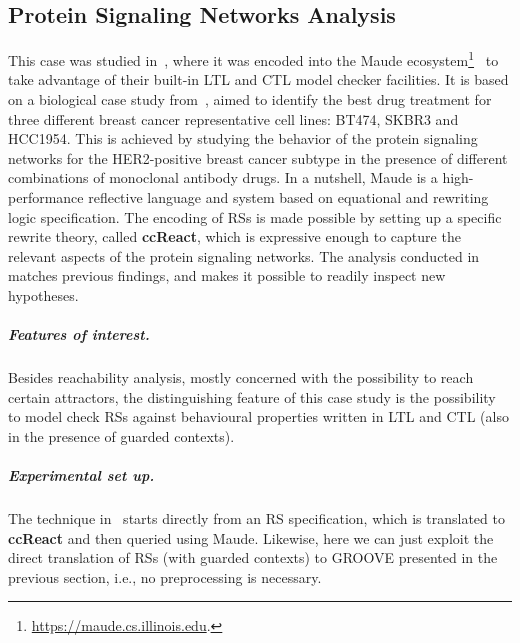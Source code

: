 
\subsection{Protein Signaling Networks Analysis}\label{sec:ccReact}

This case was studied in~\cite{DBLP:conf/cmsb/BallisBFO24}, where it was encoded into the Maude ecosystem\footnote{\url{https://maude.cs.illinois.edu}.}~\cite{DBLP:conf/maude/2007} to take advantage of their built-in LTL and CTL model checker facilities. It is based on a biological case study from~\cite{derHeyde2014}, aimed to identify the best drug treatment for three different breast cancer representative cell lines: BT474, SKBR3 and HCC1954. This is achieved by studying the behavior of the protein signaling networks for the HER2-positive breast cancer subtype in the presence of different combinations of monoclonal antibody drugs.
In a nutshell, Maude is a high-performance reflective language and system based on equational and rewriting logic specification. 
The encoding of RSs is made possible by setting up a specific rewrite theory, called \textbf{ccReact}, which is expressive enough to capture the relevant aspects of the protein signaling networks.
The analysis conducted in~\cite{DBLP:conf/cmsb/BallisBFO24} matches previous findings, and makes it possible to readily inspect new hypotheses.

\subparagraph*{Features of interest.}
Besides reachability analysis, mostly concerned with the possibility to reach certain attractors, the distinguishing feature of this case study is the possibility to model check RSs against behavioural properties written in LTL and CTL (also in the presence of guarded contexts).

\subparagraph*{Experimental set up.}
The technique in~\cite{DBLP:conf/cmsb/BallisBFO24} starts directly from an RS specification, which is translated to \textbf{ccReact} and then queried using Maude. Likewise, here we can just exploit the direct translation of RSs (with guarded contexts) to GROOVE presented in the previous section, i.e., no preprocessing is necessary.

